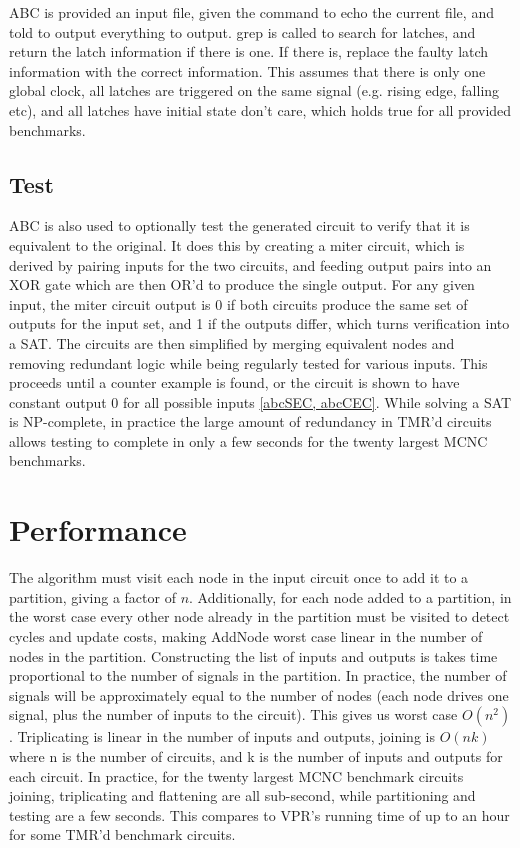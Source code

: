 \documentclass[12pt,final,oneside]{dwThesis} %
\begin{document}
   \gls{ABC} is provided an input file, given the command to echo the current
   file, and told to output everything to output.  grep is called to search for
   latches, and return the latch information if there is one. If there is,
   replace the faulty latch information with the correct information.  This
   assumes that there is only one global clock, all latches are triggered on
   the same signal (e.g. rising edge, falling etc), and all latches have
   initial state don't care, which holds true for all provided benchmarks.


   \subsection{Test}
   \label{algTest} \gls{ABC} is also used to optionally test
   the generated circuit to verify that it is equivalent to the original. It
   does this by creating a miter circuit, which is derived by pairing inputs
   for the two circuits, and feeding output pairs into an XOR gate which are
   then OR'd to produce the single output. For any given input, the miter
   circuit output is 0 if both circuits produce the same set of outputs for the
   input set, and 1 if the outputs differ, which turns verification into a
   \gls{SAT}.  The circuits are then simplified by merging equivalent nodes and
   removing redundant logic while being regularly tested for various inputs.
   This proceeds until a counter example is found, or the circuit is shown to
   have constant output 0 for all possible inputs \ref{abcSEC, abcCEC}.  While
   solving a \gls{SAT} is NP-complete, in practice the large amount of
   redundancy in \gls{TMR}'d circuits allows testing to complete in only a few
   seconds for the twenty largest \gls{MCNC} benchmarks.


   \section{Performance}
   The algorithm must visit each node in the input
   circuit once to add it to a partition, giving a factor of $n$.
   Additionally, for each node added to a partition, in the worst case every
   other node already in the partition must be visited to detect cycles and
   update costs, making AddNode worst case linear in the number of nodes in the
   partition.  Constructing the list of inputs and outputs is takes time
   proportional to the number of signals in the partition. In practice, the
   number of signals will be approximately equal to the number of nodes (each
   node drives one signal, plus the number of inputs to the circuit).  This
   gives us worst case $O(n^2)$.  Triplicating is linear in the number of
   inputs and outputs, joining is $O(nk)$ where n is the number of circuits,
   and k is the number of inputs and outputs for each circuit.  In practice, for the twenty
   largest \gls{MCNC} benchmark circuits joining, triplicating and flattening
   are all sub-second, while partitioning and testing are a few seconds. This
   compares to \gls{VPR}'s running time of up to an hour for some \gls{TMR}'d
   benchmark circuits.  
\end{document}
